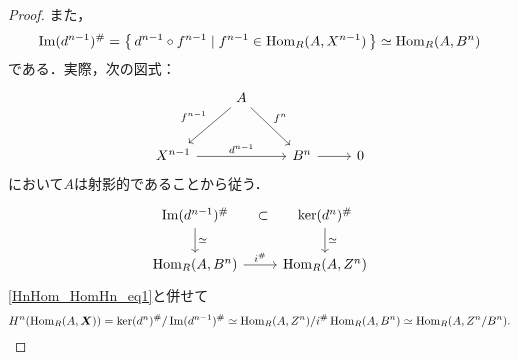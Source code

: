 \begin{proof}
  また，
  \[ \operatorname{Im} (d^{n-1})^\# = \left\{\, d^{n-1} \circ f^{n-1} \mid f^{n-1} \in \operatorname{Hom}_R (A, X^{n-1}) \,\right\} \simeq \operatorname{Hom}_R (A, B^n) \]
  である．実際，次の図式：
  \[
  \begin{tikzcd}
    & A \arrow[ld, "f^{n-1}"']\arrow[rd, "f^n"] \\[8pt]
    X^{n-1} \arrow[rr, "d^{n-1}"] &[-20pt] & B^n \arrow[r] & 0
  \end{tikzcd}
  \]
  において$A$は射影的であることから従う．
  \[
  \begin{tikzcd}
    \Im (d^{n-1})^\# \arrow[r, phantom, "\subset"]\arrow[d, "\simeq"] & \ker (d^n)^\# \arrow[d, "\simeq"] \\
    \Hom_R (A, B^n) \arrow[r, "i^\#"] & \Hom_R (A, Z^n)
  \end{tikzcd}
  \]
  \eqref{HnHom_HomHn_eq1}と併せて
  \[ H^n (\operatorname{Hom}_R(A, \boldsymbol{X})) = \ker (d^n)^\# / \operatorname{Im} (d^{n-1})^\# \simeq \operatorname{Hom}_R (A, Z^n) / i^\# \operatorname{Hom}_R (A, B^n) \simeq \operatorname{Hom}_R (A, Z^n/B^n). \]
\end{proof}

